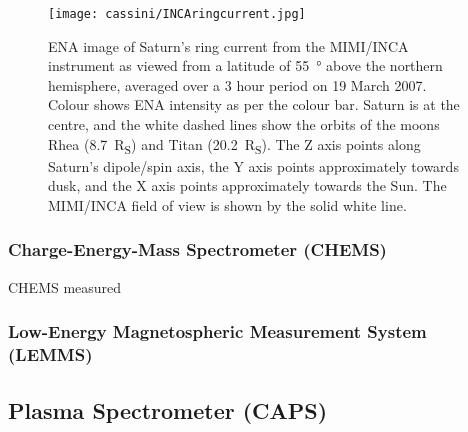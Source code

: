 \begin{figure}
\centering
\noindent\texttt{[image: cassini/INCAringcurrent.jpg]}
\caption[ENA image of Saturn's ring current from MIMI/INCA.]{ENA image of Saturn's ring current from the MIMI/INCA instrument as viewed from a latitude of \SI{55}{\degree} above the northern hemisphere, averaged over a 3 hour period on 19 March 2007. Colour shows ENA intensity as per the colour bar. Saturn is at the  centre, and the white dashed lines show the orbits of the moons Rhea (\SI{8.7}{R_S}) and Titan (\SI{20.2}{R_S}). The Z axis points along Saturn's dipole/spin axis, the Y axis points approximately towards dusk, and the X axis points approximately  towards the Sun. The MIMI/INCA field of view is shown by the solid white line.}
\label{cassini:fig:INCAringcurrent}
\end{figure}

\subsubsection{Charge-Energy-Mass Spectrometer (CHEMS)}
CHEMS measured 
\subsubsection{Low-Energy Magnetospheric Measurement System (LEMMS)}

\subsection{Plasma Spectrometer (CAPS)}
